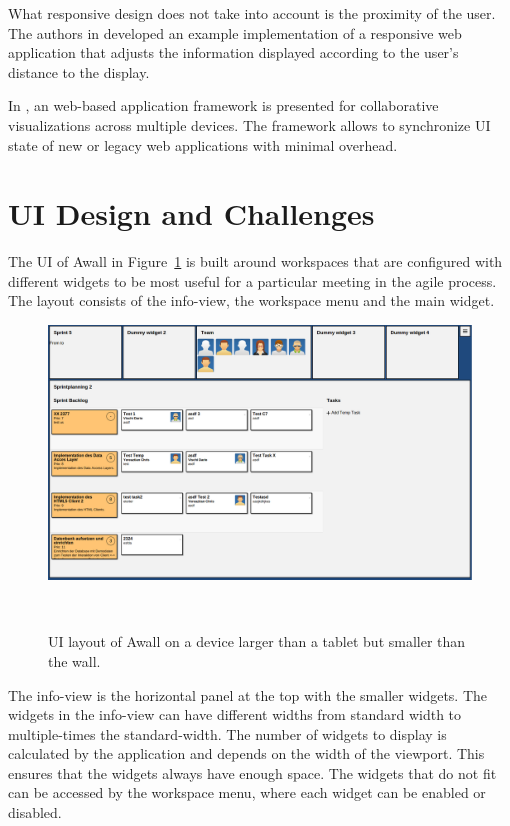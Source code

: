 \documentclass{sigchi}
\begin{document}
What responsive design does not take into account is the proximity of the user. 
The authors in \cite{Sukale:2014:PWD:2638728.2638768} developed an example implementation of a responsive web application that adjusts the information displayed according to the user's distance to the display.

In \cite{Badam:2014:PCF:2669485.2669518}, an web-based application framework is presented for collaborative visualizations across multiple devices. The framework allows to synchronize UI state of new or legacy web applications with minimal overhead.


\section{UI Design and Challenges}
The UI of Awall in Figure~\ref{fig:awall-layout} is built around workspaces that are configured with different widgets to be most useful for a particular meeting in the agile process.
The layout consists of the info-view, the workspace menu and the main widget.

\begin{figure}
	\centering
	\includegraphics[width=\columnwidth]{figures/awall-layout}
	\caption{UI layout of Awall on a device larger than a tablet but smaller than the wall.}~\label{fig:awall-layout}
\end{figure}

The info-view is the horizontal panel at the top with the smaller widgets.
The widgets in the info-view can have different widths from standard width to multiple-times the standard-width.
The number of widgets to display is calculated by the application and depends on the width of the viewport.
This ensures that the widgets always have enough space.
The widgets that do not fit can be accessed by the workspace menu, where each widget can be enabled or disabled. 
\end{document}
